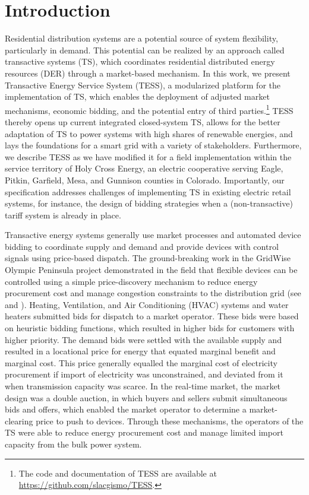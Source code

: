\section{Introduction}

Residential distribution systems are a potential source of system flexibility, particularly in demand. This potential can be realized by an approach called transactive systems (TS), which coordinates residential distributed energy resources (DER) through a market-based mechanism. 
In this work, we present Transactive Energy Service System (TESS), a modularized platform for the implementation of TS, which enables the deployment of adjusted market mechanisms, economic bidding, and the potential entry of third parties.\footnote{The code and documentation of TESS are available at \url{https://github.com/slacgismo/TESS}.} TESS thereby opens up current integrated closed-system TS, allows for the better adaptation of TS to power systems with high shares of renewable energies, and lays the foundations for a smart grid with a variety of stakeholders.
Furthermore, we describe TESS as we have modified it for a field implementation within the service territory of Holy Cross Energy, an electric cooperative serving Eagle, Pitkin, Garfield, Mesa, and Gunnison counties in Colorado. Importantly, our specification addresses challenges of implementing TS in existing electric retail systems, for instance, the design of bidding strategies when a (non-transactive) tariff system is already in place.

Transactive energy systems generally use market processes and automated device bidding to coordinate supply and demand and provide devices with control signals using price-based dispatch. The ground-breaking work in the GridWise Olympic Peninsula project demonstrated in the field that flexible devices can be controlled using a simple price-discovery mechanism to reduce energy procurement cost and manage congestion constraints to the distribution grid (see \citet{PNNL2006} and \citet{hammerstrom_2008}). Heating, Ventilation, and Air Conditioning (HVAC) systems and water heaters submitted bids for dispatch to a market operator. These bids were based on heuristic bidding functions, which resulted in higher bids for customers with higher priority.
The demand bids were settled with the available supply and resulted in a locational price for energy that equated marginal benefit and marginal cost.
This price generally equalled the marginal cost of electricity procurement if import of electricity was unconstrained, and deviated from it when transmission capacity was scarce. In the real-time market, the market design was a double auction, in which buyers and sellers submit simultaneous bids and offers, which enabled the market operator to determine a market-clearing price to push to devices. Through these mechanisms, the operators of the TS were able to reduce energy procurement cost and manage limited import capacity from the bulk power system.

